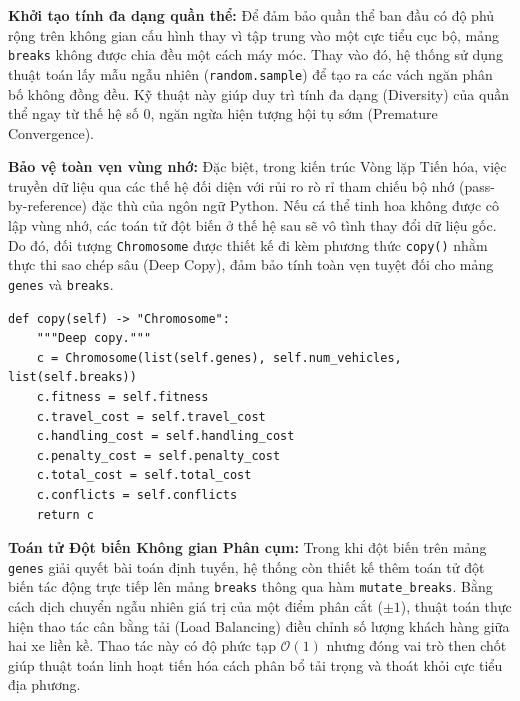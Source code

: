 \documentclass[12pt,a4paper]{article}
\numberwithin{figure}{subsection}
\numberwithin{table}{subsection}
\newcounter{codecounter}
\newenvironment{codeblock}[2]{%
    \refstepcounter{codecounter}%
    \phantomsection%
    \label{#1}%
    \par\smallskip
}{%
    \par\smallskip
}
\begin{document}
\textbf{Khởi tạo tính đa dạng quần thể:} Để đảm bảo quần thể ban đầu có độ phủ rộng trên không gian cấu hình thay vì tập trung vào một cực tiểu cục bộ, mảng \texttt{breaks} không được chia đều một cách máy móc. Thay vào đó, hệ thống sử dụng thuật toán lấy mẫu ngẫu nhiên (\texttt{random.sample}) để tạo ra các vách ngăn phân bố không đồng đều. Kỹ thuật này giúp duy trì tính đa dạng (Diversity) của quần thể ngay từ thế hệ số 0, ngăn ngừa hiện tượng hội tụ sớm (Premature Convergence).

\textbf{Bảo vệ toàn vẹn vùng nhớ:} Đặc biệt, trong kiến trúc Vòng lặp Tiến hóa, việc truyền dữ liệu qua các thế hệ đối diện với rủi ro rò rỉ tham chiếu bộ nhớ (pass-by-reference) đặc thù của ngôn ngữ Python. Nếu cá thể tinh hoa không được cô lập vùng nhớ, các toán tử đột biến ở thế hệ sau sẽ vô tình thay đổi dữ liệu gốc. Do đó, đối tượng \texttt{Chromosome} được thiết kế đi kèm phương thức \texttt{copy()} nhằm thực thi sao chép sâu (Deep Copy), đảm bảo tính toàn vẹn tuyệt đối cho mảng \texttt{genes} và \texttt{breaks}.

\begin{codeblock}{app:code:chromosome-copy}{Sao chép sâu Chromosome}
\begin{verbatim}
def copy(self) -> "Chromosome":
    """Deep copy."""
    c = Chromosome(list(self.genes), self.num_vehicles, list(self.breaks))
    c.fitness = self.fitness
    c.travel_cost = self.travel_cost
    c.handling_cost = self.handling_cost
    c.penalty_cost = self.penalty_cost
    c.total_cost = self.total_cost
    c.conflicts = self.conflicts
    return c
\end{verbatim}
\end{codeblock}


\textbf{Toán tử Đột biến Không gian Phân cụm:} Trong khi đột biến trên mảng \texttt{genes} giải quyết bài toán định tuyến, hệ thống còn thiết kế thêm toán tử đột biến tác động trực tiếp lên mảng \texttt{breaks} thông qua hàm \texttt{mutate\_breaks}. Bằng cách dịch chuyển ngẫu nhiên giá trị của một điểm phân cắt ($\pm 1$), thuật toán thực hiện thao tác cân bằng tải (Load Balancing) điều chỉnh số lượng khách hàng giữa hai xe liền kề. Thao tác này có độ phức tạp $\mathcal{O}(1)$ nhưng đóng vai trò then chốt giúp thuật toán linh hoạt tiến hóa cách phân bổ tải trọng và thoát khỏi cực tiểu địa phương.
\end{document}
